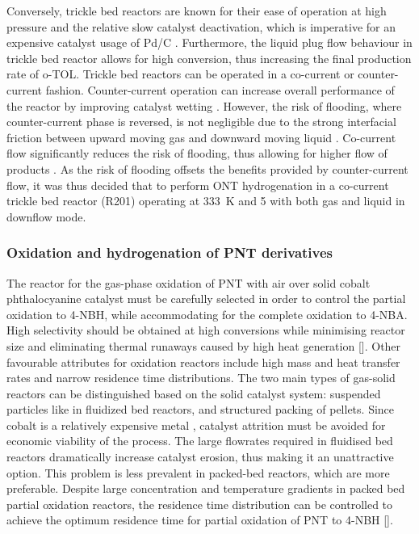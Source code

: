 Conversely, trickle bed reactors are known for their ease of operation at high pressure and the relative slow catalyst deactivation, which is imperative for an expensive catalyst usage of Pd/C \cite{vemala_hydrodynamic_nodate}. Furthermore, the liquid plug flow behaviour in trickle bed reactor allows for high conversion, thus increasing the final production rate of o-TOL. Trickle bed reactors can be operated in a co-current or counter-current fashion. Counter-current operation can increase overall performance of the reactor by improving catalyst wetting \cite{kundu_novel_2003}. However, the risk of flooding, where counter-current phase is reversed, is not negligible due to the strong interfacial friction between upward moving gas and downward moving liquid \cite{breijer_prevention_2008}. Co-current flow significantly reduces the risk of flooding, thus allowing for higher flow of products \cite{vemala_hydrodynamic_nodate}. As the risk of flooding offsets the benefits provided by counter-current flow, it was thus decided that to perform ONT hydrogenation in a co-current trickle bed reactor (R201) operating at \SI{333}{\K} and \SI{5}{\atm} with both gas and liquid in downflow mode. 


\subsubsection{Oxidation and hydrogenation of PNT derivatives}

The reactor for the gas-phase oxidation of PNT with air over solid cobalt phthalocyanine catalyst must be carefully selected in order to control the partial oxidation to 4-NBH, while accommodating for the complete oxidation to 4-NBA. High selectivity should be obtained at high conversions while minimising reactor size and eliminating thermal runaways caused by high heat generation []. Other favourable attributes for oxidation reactors include high  mass and heat transfer rates and narrow residence time distributions. The two main types of gas-solid reactors can be distinguished based on the solid catalyst system: suspended particles like in fluidized bed reactors, and structured packing of pellets. Since cobalt is a relatively expensive metal \cite{saib_fundamental_2014}, catalyst attrition must be avoided for economic viability of the process. The large flowrates required in fluidised bed reactors dramatically increase catalyst erosion, thus making it an unattractive option. This problem is less prevalent in packed-bed reactors, which are more preferable. Despite large concentration and temperature gradients in packed bed partial oxidation reactors, the residence time distribution can be controlled to achieve the optimum residence time for partial oxidation of PNT to 4-NBH [].

